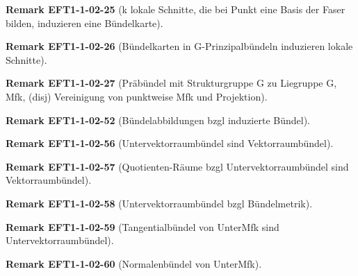 \documentclass[10pt, letterpaper]{article}
\newcommand{\CustomHeading}[3]{%
  \par\medskip\noindent%
  \textbf{#1 #2} \textnormal{(#3)}.\enskip%
}
\newenvironment{REM}[2]{\CustomHeading{Remark}{#1}{#2}}{}
\begin{document}
\begin{REM}{EFT1-1-02-25}{k lokale Schnitte, die bei Punkt eine Basis der Faser bilden, induzieren eine Bündelkarte}

\end{REM}

\begin{REM}{EFT1-1-02-26}{Bündelkarten in G-Prinzipalbündeln induzieren lokale Schnitte}

\end{REM}

\begin{REM}{EFT1-1-02-27}{Präbündel mit Strukturgruppe G zu Liegruppe G, Mfk, (disj) Vereinigung von punktweise Mfk und Projektion}

\end{REM}

\begin{REM}{EFT1-1-02-52}{Bündelabbildungen bzgl induzierte Bündel}

\end{REM}

\begin{REM}{EFT1-1-02-56}{Untervektorraumbündel sind Vektorraumbündel}

\end{REM}

\begin{REM}{EFT1-1-02-57}{Quotienten-Räume bzgl Untervektorraumbündel sind Vektorraumbündel}

\end{REM}

\begin{REM}{EFT1-1-02-58}{Untervektorraumbündel bzgl Bündelmetrik}

\end{REM}

\begin{REM}{EFT1-1-02-59}{Tangentialbündel von UnterMfk sind Untervektorraumbündel}

\end{REM}

\begin{REM}{EFT1-1-02-60}{Normalenbündel von UnterMfk}

\end{REM}






























\pagebreak


\printbibliography
\end{document}

